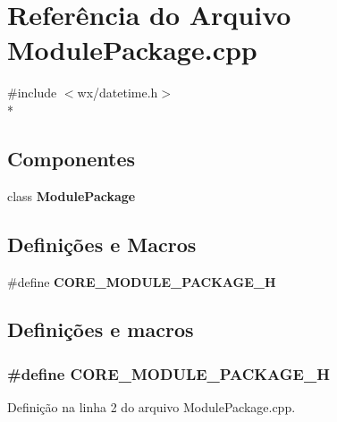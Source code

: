 \section{Referência do Arquivo Module\+Package.\+cpp}
\label{_module_package_8cpp}
{\ttfamily \#include $<$wx/datetime.\+h$>$}\\*
\subsection*{Componentes}
\begin{DoxyCompactItemize}
\item 
class {\bf Module\+Package}
\end{DoxyCompactItemize}
\subsection*{Definições e Macros}
\begin{DoxyCompactItemize}
\item 
\#define {\bf C\+O\+R\+E\+\_\+\+M\+O\+D\+U\+L\+E\+\_\+\+P\+A\+C\+K\+A\+G\+E\+\_\+H}
\end{DoxyCompactItemize}


\subsection{Definições e macros}
\subsubsection[{C\+O\+R\+E\+\_\+\+M\+O\+D\+U\+L\+E\+\_\+\+P\+A\+C\+K\+A\+G\+E\+\_\+H}]{\setlength{\rightskip}{0pt plus 5cm}\#define C\+O\+R\+E\+\_\+\+M\+O\+D\+U\+L\+E\+\_\+\+P\+A\+C\+K\+A\+G\+E\+\_\+H}\label{_module_package_8cpp_a03456779c6d514741f39e8d0dbdceb1b}


Definição na linha 2 do arquivo Module\+Package.\+cpp.

